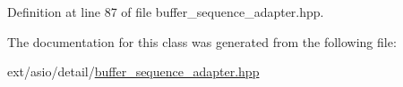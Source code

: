 Definition at line 87 of file buffer\+\_\+sequence\+\_\+adapter.\+hpp.



The documentation for this class was generated from the following file\+:\begin{DoxyCompactItemize}
\item 
ext/asio/detail/\hyperlink{buffer__sequence__adapter_8hpp}{buffer\+\_\+sequence\+\_\+adapter.\+hpp}\end{DoxyCompactItemize}
